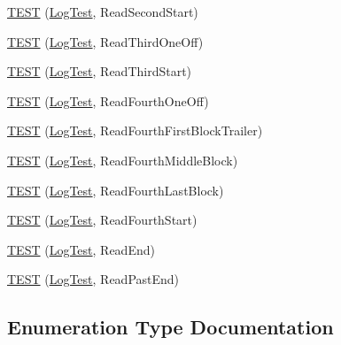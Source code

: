 \begin{DoxyCompactItemize}
\item 
\hyperlink{namespaceleveldb_1_1log_aa9e212a334431228c79a843316480db0}{T\+E\+S\+T} (\hyperlink{classleveldb_1_1log_1_1_log_test}{Log\+Test}, Read\+Second\+Start)
\item 
\hyperlink{namespaceleveldb_1_1log_af5f8505f08225382f290158f5175cca0}{T\+E\+S\+T} (\hyperlink{classleveldb_1_1log_1_1_log_test}{Log\+Test}, Read\+Third\+One\+Off)
\item 
\hyperlink{namespaceleveldb_1_1log_a87cfcd7bb0a248dc72d9856e1d00d519}{T\+E\+S\+T} (\hyperlink{classleveldb_1_1log_1_1_log_test}{Log\+Test}, Read\+Third\+Start)
\item 
\hyperlink{namespaceleveldb_1_1log_abbda151ff0e2439ac1dfa823a6089439}{T\+E\+S\+T} (\hyperlink{classleveldb_1_1log_1_1_log_test}{Log\+Test}, Read\+Fourth\+One\+Off)
\item 
\hyperlink{namespaceleveldb_1_1log_a85f6833939c09f181924774403bfbe4f}{T\+E\+S\+T} (\hyperlink{classleveldb_1_1log_1_1_log_test}{Log\+Test}, Read\+Fourth\+First\+Block\+Trailer)
\item 
\hyperlink{namespaceleveldb_1_1log_a6fb47c0abe5c036d95a4f9aeb1d62174}{T\+E\+S\+T} (\hyperlink{classleveldb_1_1log_1_1_log_test}{Log\+Test}, Read\+Fourth\+Middle\+Block)
\item 
\hyperlink{namespaceleveldb_1_1log_a9c80a844e21aec7c6fbde209e99c1ad8}{T\+E\+S\+T} (\hyperlink{classleveldb_1_1log_1_1_log_test}{Log\+Test}, Read\+Fourth\+Last\+Block)
\item 
\hyperlink{namespaceleveldb_1_1log_aa652940a4e7bff7fa21f0d1c941712d7}{T\+E\+S\+T} (\hyperlink{classleveldb_1_1log_1_1_log_test}{Log\+Test}, Read\+Fourth\+Start)
\item 
\hyperlink{namespaceleveldb_1_1log_a74e0fb6c39041d1ef2193114b0a2275b}{T\+E\+S\+T} (\hyperlink{classleveldb_1_1log_1_1_log_test}{Log\+Test}, Read\+End)
\item 
\hyperlink{namespaceleveldb_1_1log_ae1081d375c33d8b2f01d5593ecd5f4a7}{T\+E\+S\+T} (\hyperlink{classleveldb_1_1log_1_1_log_test}{Log\+Test}, Read\+Past\+End)
\end{DoxyCompactItemize}


\subsection{Enumeration Type Documentation}
\hypertarget{namespaceleveldb_1_1log_a01bdc1b51beb634f14f8fbb70fbd8d2a}{}
